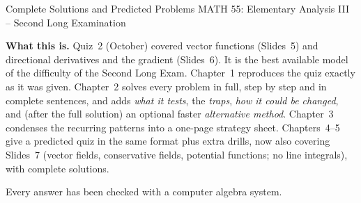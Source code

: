 \documentclass[11pt,a4paper]{article}
\begin{document}

  {Complete Solutions and Predicted Problems}
  {MATH 55: Elementary Analysis III -- Second Long Examination}
  {\textbf{What this is.} Quiz~2 (October) covered vector functions
   (Slides~5) and directional derivatives and the gradient (Slides~6). It is
   the best available model of the difficulty of the Second Long Exam.
   Chapter~1 reproduces the quiz exactly as it was given. Chapter~2 solves
   every problem in full, step by step and in complete sentences, and adds
   \emph{what it tests}, the \emph{traps}, \emph{how it could be changed}, and
   (after the full solution) an optional faster \emph{alternative method}.
   Chapter~3 condenses the recurring patterns into a one-page strategy sheet.
   Chapters~4--5 give a predicted quiz in the same format plus extra drills,
   now also covering Slides~7 (vector fields, conservative fields, potential
   functions; no line integrals), with complete solutions.\par\medskip
   Every answer has been checked with a computer algebra system.}

\tableofcontents
\clearpage
{}






\end{document}
